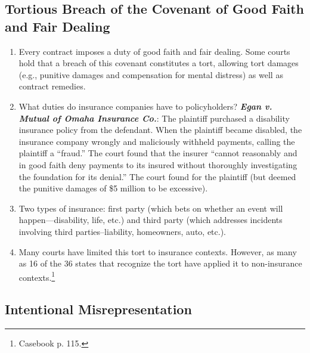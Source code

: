 \subsection{Tortious Breach of the Covenant of Good Faith and Fair Dealing}

\begin{enumerate}
    \item Every contract imposes a duty of good faith and fair dealing. Some 
    courts hold that a breach of this covenant constitutes a tort, allowing 
    tort damages (e.g., punitive damages and compensation for mental distress) 
    as well as contract remedies.
    \item What duties do insurance companies have to policyholders? 
    \textbf{\emph{Egan v. Mutual of Omaha Insurance Co.}}: The plaintiff 
    purchased a disability insurance policy from the defendant. When the 
    plaintiff became disabled, the insurance company wrongly and maliciously 
    withheld payments, calling the plaintiff a ``fraud.'' The court found that 
    the insurer ``cannot reasonably and in good faith deny payments to its 
    insured without thoroughly investigating the foundation for its denial.'' 
    The court found for the plaintiff (but deemed the punitive damages of \$5 
    million to be excessive).
    \item Two types of insurance: first party (which bets on whether an event 
    will happen---disability, life, etc.) and third party (which addresses 
    incidents involving third parties--liability, homeowners, auto, etc.).
    \item Many courts have limited this tort to insurance contexts. However, 
    as many as 16 of the 36 states that recognize the tort have applied it to 
    non-insurance contexts.\footnote{Casebook p. 115.}
\end{enumerate}

\subsection{Intentional Misrepresentation}

